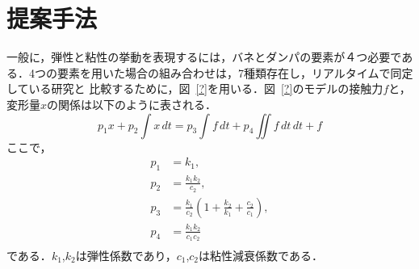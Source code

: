 \documentclass[a4paper]{jarticle}
\begin{document}
\section{提案手法}
一般に，弾性と粘性の挙動を表現するには，バネとダンパの要素が４つ必要である\cite{?}．4つの要素を用いた場合の組み合わせは，7種類存在し，リアルタイムで同定している研究\cite{??}と
比較するために，図~\ref{?}を用いる．図~\ref{?}のモデルの接触力$f$と，変形量$x$の関係は以下のように表される．
\begin{equation}
p_1 {x} + p_2 \int{x}\,dt = p_3\int{f}\,dt +p_4\iint{f}\,dt\,dt  + f
\label{eq:BSmodel}
\end{equation}
ここで，
\begin{equation}
    \begin{aligned}
        p_1 &= k_1,  \\
        p_2 &= \frac{k_1 k_2}{c_2},    \\
        p_3 &= \frac{k_1}{c_2}\left(1+\frac{k_2}{k_1}+\frac{c_2}{c_1}\right),\\
        p_4 &= \frac{k_1k_2}{c_1 c_2} \\
    \end{aligned}
    \label{eq:p2ck}
\end{equation}
である．$k_1$,$k_2$は弾性係数であり，$c_1$,$c_2$は粘性減衰係数である．
\end{document}
